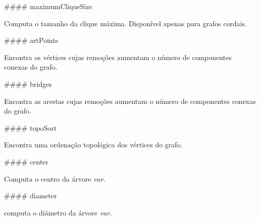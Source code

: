 \#\#\#\# maximum\+Clique\+Size 
\begin{DoxyCode}{0}
\end{DoxyCode}
 Computa o tamanho da clique máxima. Disponível apenas para grafos cordais.

\#\#\#\# art\+Points 
\begin{DoxyCode}{0}
\end{DoxyCode}
 Encontra os vértices cujas remoções aumentam o número de componentes conexas do grafo.

\#\#\#\# bridges 
\begin{DoxyCode}{0}
\end{DoxyCode}
 Encontra as arestas cujas remoções aumentam o número de componentes conexas do grafo.

\#\#\#\# topo\+Sort 
\begin{DoxyCode}{0}
\end{DoxyCode}
 Encontra uma ordenação topológica dos vértices do grafo.

\#\#\#\# center 
\begin{DoxyCode}{0}
\end{DoxyCode}
 Computa o centro da árvore {\itshape var}.

\#\#\#\# diameter 
\begin{DoxyCode}{0}
\end{DoxyCode}
 computa o diâmetro da árvore {\itshape var}. 